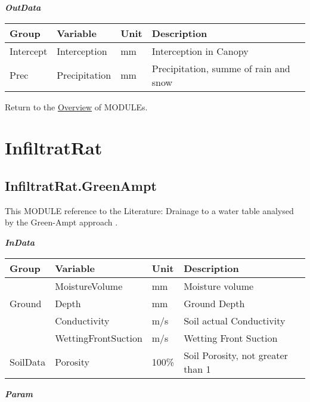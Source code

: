 \documentclass[
]{book}
\begin{document}
\textbf{\emph{OutData}}

\begin{table}[!h]
\centering
\begin{tabular}{l|l|l|l}
\hline
Group & Variable & Unit & Description\\
\hline
Intercept & Interception & mm & Interception in Canopy\\
\cline{1-4}
Prec & Precipitation & mm & Precipitation, summe of rain and snow\\
\hline
\end{tabular}
\end{table}

Return to the \protect\hyperlink{module}{Overview} of MODULEs.

\hypertarget{InfiltratRat}{%
\section{InfiltratRat}\label{InfiltratRat}}

\hypertarget{InfiltratRat.GreenAmpt}{%
\subsection{InfiltratRat.GreenAmpt}\label{InfiltratRat.GreenAmpt}}

This MODULE reference to the Literature: Drainage to a water table analysed by the Green-Ampt approach \citep{Youngs.1976}.

\textbf{\emph{InData}}

\begin{table}[!h]
\centering
\begin{tabular}{l|l|l|l}
\hline
Group & Variable & Unit & Description\\
\hline
 & MoistureVolume & mm & Moisture volume\\
\cline{2-4}
\multirow{-2}{*}{\raggedright\arraybackslash Ground} & Depth & mm & Ground Depth\\
\cline{1-4}
 & Conductivity & m/s & Soil actual Conductivity\\
\cline{2-4}
 & WettingFrontSuction & m/s & Wetting Front Suction\\
\cline{2-4}
\multirow{-3}{*}{\raggedright\arraybackslash SoilData} & Porosity & 100\% & Soil Porosity, not greater than 1\\
\hline
\end{tabular}
\end{table}

\textbf{\emph{Param}}
\end{document}
